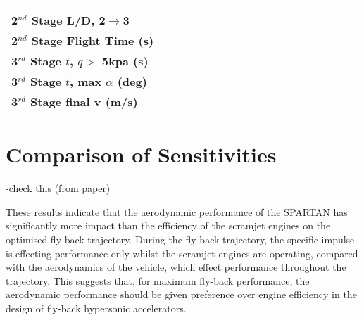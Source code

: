 \begin{table}[ht]
\begin{tabular}{l c c c c c}
	& \secondthirdSeparationqmSPARTANninetyfivepercent
	& \secondthirdSeparationqmSPARTANonehundredpercent
	& \secondthirdSeparationqmSPARTANonehundredandfivepercent
	& \secondthirdSeparationqmSPARTANonehundredandtenpercent
	\\
	\textbf{2$^{nd}$ Stage L/D, 2$\rightarrow$3}
	& \secondthirdSeparationLDmSPARTANninetypercent
	& \secondthirdSeparationLDmSPARTANninetyfivepercent
	& \secondthirdSeparationLDmSPARTANonehundredpercent
	& \secondthirdSeparationLDmSPARTANonehundredandfivepercent
	& \secondthirdSeparationLDmSPARTANonehundredandtenpercent
	\\
	\textbf{2$^{nd}$ Stage Flight Time (s)}
	& \secondFlightTimemSPARTANninetypercent
	& \secondFlightTimemSPARTANninetyfivepercent
	& \secondFlightTimemSPARTANonehundredpercent
	& \secondFlightTimemSPARTANonehundredandfivepercent
	& \secondFlightTimemSPARTANonehundredandtenpercent
	\\
	\textbf{3$^{rd}$ Stage $t$, $q >$ 5kpa (s)}
	& \thirdqOverFivemSPARTANninetypercent
	& \thirdqOverFivemSPARTANninetyfivepercent
	& \thirdqOverFivemSPARTANonehundredpercent
	& \thirdqOverFivemSPARTANonehundredandfivepercent
	& \thirdqOverFivemSPARTANonehundredandtenpercent
	\\
	\textbf{3$^{rd}$ Stage $t$, max $\alpha$ (deg)}
	& \thirdmaxAoAmSPARTANninetypercent
	& \thirdmaxAoAmSPARTANninetyfivepercent
	& \thirdmaxAoAmSPARTANonehundredpercent
	& \thirdmaxAoAmSPARTANonehundredandfivepercent
	& \thirdmaxAoAmSPARTANonehundredandtenpercent
	\\
	\hline \textbf{3$^{rd}$ Stage final v (m/s)}
	& \thirdcircvmSPARTANninetypercent
	& \thirdcircvmSPARTANninetyfivepercent
	& \thirdcircvmSPARTANonehundredpercent
	& \thirdcircvmSPARTANonehundredandfivepercent
	& \thirdcircvmSPARTANonehundredandtenpercent
	\\
	\hline 
\end{tabular} 
\end{table}



\section{Comparison of Sensitivities}

-check this (from paper)

These results indicate that the aerodynamic performance of the SPARTAN has significantly more impact than the efficiency of the scramjet engines on the optimised fly-back trajectory. During the fly-back trajectory, the specific impulse is effecting performance only whilst the scramjet engines are operating, compared with the aerodynamics of the vehicle, which effect performance throughout the trajectory. This suggests that, for maximum fly-back performance, the aerodynamic performance should be given preference over engine efficiency in the design of fly-back hypersonic accelerators. 







